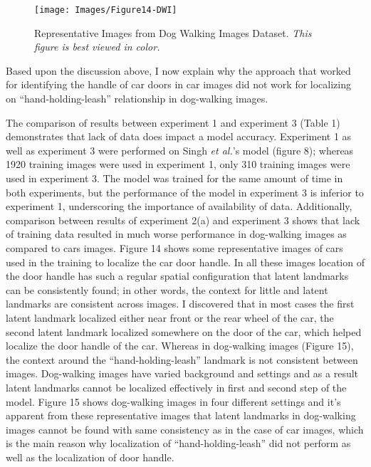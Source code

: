 \documentclass [11pt,letterpaper ,twoside ,openany ]{report}
\begin{document}
    \begin{figure}[h]
      \centering
      \texttt{[image: Images/Figure14-DWI]}
      \caption{Representative Images from Dog Walking Images Dataset. \textit{This figure is best viewed in color.}}
      \label{fig:dwi}
    \end{figure}            

    Based upon the discussion above, I now explain why the approach that worked for identifying the handle of car doors in car images did not work for localizing on ``hand-holding-leash'' relationship in dog-walking images.    

    The comparison of results between experiment 1 and experiment 3 (Table 1) demonstrates that lack of data does impact a model accuracy. Experiment 1 as well as experiment 3 were performed on Singh \textit{et al.}'s model (figure 8); whereas 1920 training images were used in experiment 1, only 310 training images were used in experiment 3. The model was trained for the same amount of time in both experiments, but the performance of the model in experiment 3 is inferior to experiment 1, underscoring the importance of availability of data. Additionally, comparison between results of experiment 2(a) and experiment 3 shows that lack of training data resulted in much worse performance in dog-walking images as compared to cars images. Figure 14 shows some representative images of cars used in the training to localize the car door handle. In all these images location of the door handle has such a regular spatial configuration that latent landmarks can be consistently found; in other words, the context for little and latent landmarks are consistent across images. I discovered that in most cases the first latent landmark localized either near front or the rear wheel of the car, the second latent landmark localized somewhere on the door of the car, which helped localize the door handle of the car. Whereas in dog-walking images (Figure 15), the context around the ``hand-holding-leash'' landmark is not consistent between images. Dog-walking images have varied background and settings and as a result latent landmarks cannot be localized effectively in first and second step of the model. Figure 15 shows dog-walking images in four different settings and it's apparent from these representative images that latent landmarks in dog-walking images cannot be found with same consistency as in the case of car images, which is the main reason why localization of ``hand-holding-leash'' did not perform as well as the localization of door handle.
\end{document}

